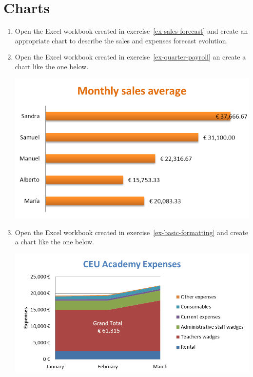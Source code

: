 
\section{Charts}
\begin{enumerate}[leftmargin=*,resume]
\item Open the Excel workbook created in exercise~\ref{ex-sales-forecast} and create an appropriate chart to describe
the sales and expenses forecast evolution. 

\item Open the Excel workbook created in exercise~\ref{ex-quarter-payroll} an create a chart like the one below. 
\begin{center}
\includegraphics[scale=0.8]{img/quarter-payroll}
\end{center}

\item Open the Excel workbook created in exercise~\ref{ex-basic-formatting} and create a chart like the one below.
\begin{center}
\includegraphics[scale=0.8]{img/basic-formatting}
\end{center}


\end{enumerate}
